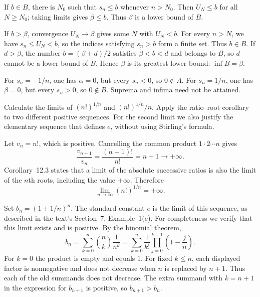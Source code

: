 If $b\in B$, there is $N_0$ such that $s_n\le b$ whenever
$n>N_0$. Then $U_N\le b$ for all $N\ge N_0$; taking limits gives
$\beta\le b$. Thus $\beta$ is a lower bound of $B$.

If $b>\beta$, convergence $U_N\to\beta$ gives some $N$ with
$U_N<b$. For every $n>N$, we have $s_n\le U_N<b$, so the
indices satisfying $s_n>b$ form a finite set. Thus $b\in B$.
If $d>\beta$, the number $b=(\beta+d)/2$ satisfies
$\beta<b<d$ and belongs to $B$, so $d$ cannot be a lower bound
of $B$. Hence $\beta$ is its greatest lower bound:
$\inf B=\beta$.

For $s_n=-1/n$, one has $\alpha=0$, but every $s_n<0$,
so $0\notin A$. For $s_n=1/n$, one has $\beta=0$, but every
$s_n>0$, so $0\notin B$. Suprema and infima need not be attained.

\goal Calculate the limits of $(n!)^{1/n}$ and $(n!)^{1/n}/n$.
\idea Apply the ratio--root corollary to two different positive
sequences. For the second limit we also justify the elementary
sequence that defines $e$, without using Stirling's formula.

Let $v_n=n!$, which is positive. Cancelling the common product
$1\cdot2\cdots n$ gives
\[
 \frac{v_{n+1}}{v_n}=\frac{(n+1)!}{n!}=n+1\longrightarrow+\infty.
\]
Corollary~12.3 states that a limit of the absolute successive ratios
is also the limit of the $n$th roots, including the value $+\infty$.
Therefore
\[
 \boxed{\lim_{n\to\infty}(n!)^{1/n}=+\infty.}
\]

Set $b_n=(1+1/n)^n$. The standard constant $e$ is the limit of
this sequence, as described in the text's Section~7, Example~1(e).
For completeness we verify that this limit exists and is positive.
By the binomial theorem,
\[
 b_n=\sum_{k=0}^{n}\binom{n}{k}\frac{1}{n^k}
 =\sum_{k=0}^{n}\frac{1}{k!}
      \prod_{j=0}^{k-1}\left(1-\frac{j}{n}\right).
\]
For $k=0$ the product is empty and equals $1$.
For fixed $k\le n$, each displayed factor is nonnegative and
does not decrease when $n$ is replaced by $n+1$. Thus each of the
old summands does not decrease. The extra summand with $k=n+1$
in the expression for $b_{n+1}$ is positive, so $b_{n+1}>b_n$.

